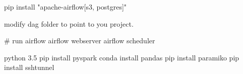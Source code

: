pip install "apache-airflow[s3, postgres]"

modify dag folder to point to you project.

# run airflow
airflow webserver
airflow scheduler


python 3.5
pip install pyspark 
conda install pandas 
pip install paramiko
pip install sshtunnel